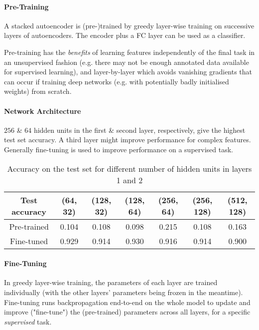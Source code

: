 \paragraph{Pre-Training}

A stacked autoencoder is (pre-)trained by greedy layer-wise training on successive layers of autoencoders.
The encoder plus a FC layer can be used as a classifier.

Pre-training has the \textit{benefits} of
learning features independently of the final task in an unsupervised fashion (e.g. there may not be enough annotated data available for supervised learning),
and layer-by-layer which avoids vanishing gradients that can occur if training deep networks (e.g. with potentially badly initialised weights) from scratch.

\paragraph{Network Architecture}

$256$ \& $64$ hidden units in the first \& second layer, respectively,
give the highest test set accuracy.
A third layer might improve performance for complex features.
Generally fine-tuning is used to improve performance on a supervised task.

\vspace{5pt}

\begin{table}[h]
\centering
\begin{tabular}{|c|c|c|c|c|c|c|}
\hline
Test accuracy & (64, 32) & (128, 32) & (128, 64) & (256, 64) & (256, 128) & (512, 128) \\
\hline
Pre-trained & 0.104 & 0.108 & 0.098 & 0.215 & 0.108 & 0.163 \\
\hline
Fine-tuned & 0.929 & 0.914 & 0.930 & 0.916 & 0.914 & 0.900 \\
\hline
\end{tabular}
\caption{Accuracy on the test set for different number of hidden units in layers 1 and 2}
\label{tab:sae-results}
\end{table}

\vspace{-12.5pt}

\paragraph{Fine-Tuning}

In greedy layer-wise training, the parameters of each layer are trained individually (with the other layers' parameters being frozen in the meantime).
Fine-tuning runs backpropagation end-to-end on the whole model
to update and improve ("fine-tune") the (pre-trained) parameters
across all layers, for a specific \textit{supervised} task.

